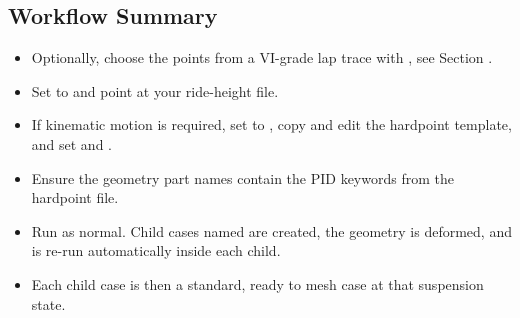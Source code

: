 \subsection{Workflow Summary}
\begin{itemize}
    \item Optionally, choose the points from a VI-grade lap trace with , see Section .

    \item Set  to  and point  at your ride-height file.

    \item If kinematic motion is required, set  to , copy and edit the hardpoint template, and set  and .

    \item Ensure the geometry part names contain the PID keywords from the hardpoint file.

    \item Run  as normal. Child cases named  are created, the geometry is deformed, and  is re-run automatically inside each child.

    \item Each child case is then a standard, ready to mesh case at that suspension state.
\end{itemize}

